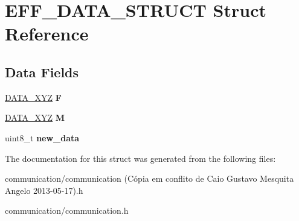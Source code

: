 \hypertarget{structEFF__DATA__STRUCT}{
\section{EFF\_\-DATA\_\-STRUCT Struct Reference}
\label{structEFF__DATA__STRUCT}
}
\subsection*{Data Fields}
\begin{DoxyCompactItemize}
\item 
\hypertarget{structEFF__DATA__STRUCT_abe8952947b54bf9c247f3429ee3aeb44}{
\hyperlink{structDATA__XYZ}{DATA\_\-XYZ} {\bfseries F}}
\label{structEFF__DATA__STRUCT_abe8952947b54bf9c247f3429ee3aeb44}

\item 
\hypertarget{structEFF__DATA__STRUCT_aaf6e03b6e600295e0f5c706fc869e9d1}{
\hyperlink{structDATA__XYZ}{DATA\_\-XYZ} {\bfseries M}}
\label{structEFF__DATA__STRUCT_aaf6e03b6e600295e0f5c706fc869e9d1}

\item 
\hypertarget{structEFF__DATA__STRUCT_aa42ebc512dd79fa6ebf998162a149446}{
uint8\_\-t {\bfseries new\_\-data}}
\label{structEFF__DATA__STRUCT_aa42ebc512dd79fa6ebf998162a149446}

\end{DoxyCompactItemize}


The documentation for this struct was generated from the following files:\begin{DoxyCompactItemize}
\item 
communication/communication (Cópia em conflito de Caio Gustavo Mesquita Angelo 2013-\/05-\/17).h\item 
communication/communication.h\end{DoxyCompactItemize}

